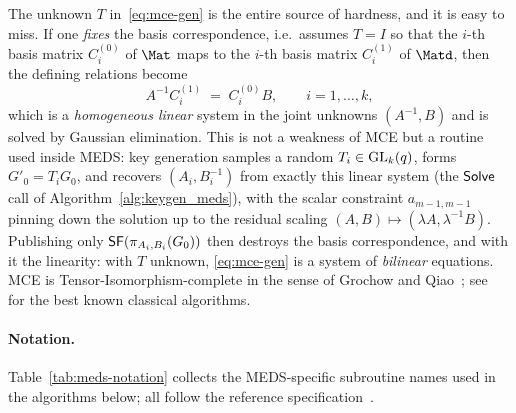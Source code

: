 \begin{remark}
\label{rem:mce-hardness}
The unknown $T$ in~\eqref{eq:mce-gen} is the entire source of hardness, and it
is easy to miss. If one \emph{fixes} the basis correspondence, i.e.\ assumes
$T = I$ so that the $i$-th basis matrix $C^{(0)}_i$ of $\Mat$ maps to the
$i$-th basis matrix $C^{(1)}_i$ of $\Matd$, then the defining relations become
\[
  A^{-1} C^{(1)}_i \;=\; C^{(0)}_i B, \qquad i = 1,\ldots,k,
\]
which is a \emph{homogeneous linear} system in the joint unknowns
$(A^{-1}, B)$ and is solved by Gaussian elimination. This is not a weakness of
MCE but a routine used inside MEDS: key generation samples a random
$T_i \in \mathrm{GL}_k(q)$, forms $G'_0 = T_i G_0$, and recovers $(A_i, B_i^{-1})$ from
exactly this linear system (the $\mathsf{Solve}$ call of
Algorithm~\ref{alg:keygen_meds}), with the scalar constraint
$a_{m-1,m-1}$ pinning down the solution up to the residual scaling
$(A,B) \mapsto (\lambda A, \lambda^{-1} B)$. Publishing only
$\mathsf{SF}(\pi_{A_i,B_i}(G_0))$ then destroys the basis correspondence, and with
it the linearity: with $T$ unknown, \eqref{eq:mce-gen} is a system of
\emph{bilinear} equations. MCE is Tensor-Isomorphism-complete in the sense of
Grochow and Qiao~\cite{GrochowQiao23}; see~\cite{ReijndersST23,NarayananQT24}
for the best known classical algorithms.
\end{remark}

\paragraph{Notation.}
Table~\ref{tab:meds-notation} collects the MEDS-specific subroutine names used
in the algorithms below; all follow the reference
specification~\cite{ChouNPRRST23,MEDS_PQC}.

